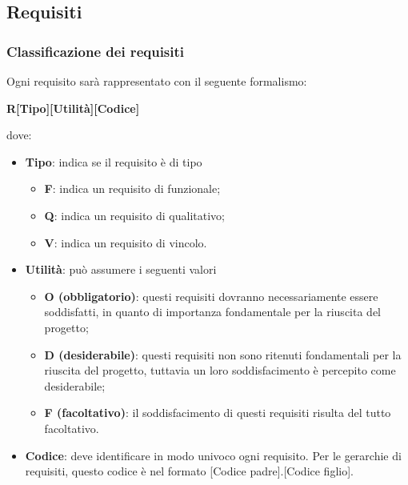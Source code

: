 \subsection{Requisiti}

\subsubsection{Classificazione dei requisiti}
Ogni requisito sarà rappresentato con il seguente formalismo:
\begin{center}
    \textbf{R[Tipo][Utilità][Codice]}
\end{center}
dove:
\begin{itemize}
	\item
	\textbf{Tipo}: indica se il requisito è di tipo
	\begin{itemize}
	    \item \textbf{F}: indica un requisito di funzionale;
	    \item \textbf{Q}: indica un requisito di qualitativo;
	    \item \textbf{V}: indica un requisito di vincolo.
	\end{itemize}
	\item
	\textbf{Utilità}: può assumere i seguenti valori
	\begin{itemize}
	    \item \textbf{O (obbligatorio)}: questi requisiti dovranno necessariamente essere soddisfatti, in quanto di importanza fondamentale per la riuscita del progetto;
	    \item \textbf{D (desiderabile)}: questi requisiti non sono ritenuti fondamentali per la riuscita del progetto, tuttavia un loro soddisfacimento è percepito come desiderabile;
	    \item \textbf{F (facoltativo)}: il soddisfacimento di questi requisiti risulta del tutto facoltativo.
	\end{itemize}
	\item
	\textbf{Codice}: deve identificare in modo univoco ogni requisito. Per le gerarchie di requisiti, questo codice è nel formato [Codice padre].[Codice figlio].
\end{itemize}

